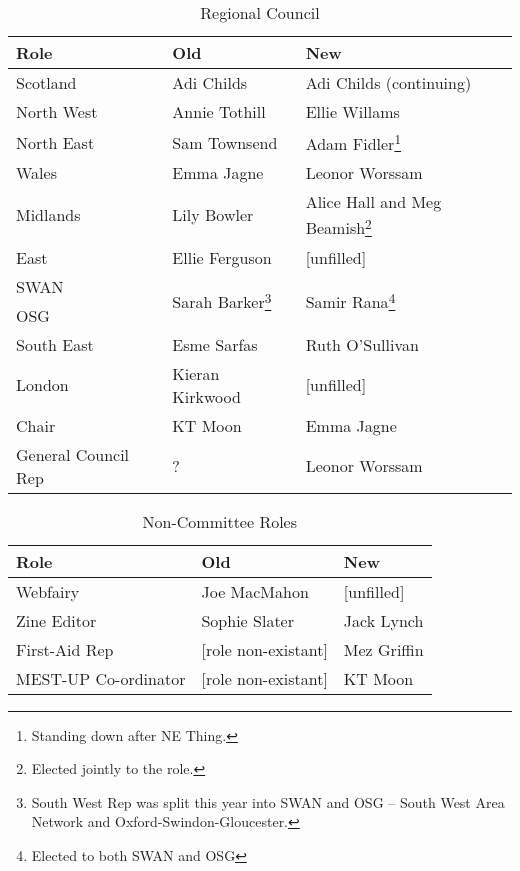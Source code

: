 \documentclass[a4paper, 12pt]{article}
\begin{document}
\begin{savenotes}
\begin{table}[H]
\centering

\begin{tabular}{ l || l | l }
\textbf{Role}		& \textbf{Old}		& \textbf{New} \\ \hline
Scotland			& Adi Childs		& Adi Childs (continuing) \\
North West			& Annie Tothill		& Ellie Willams \\
North East			& Sam Townsend		& Adam Fidler\footnote{Standing down after NE Thing.} \\
Wales				& Emma Jagne		& Leonor Worssam \\
Midlands			& Lily Bowler		& Alice Hall and Meg Beamish\footnote{Elected jointly to the role.} \\
East				& Ellie Ferguson	& [unfilled] \\
SWAN				& \multirow{2}{*}{Sarah Barker\footnote{South West Rep was split this year into SWAN and OSG -- South West Area Network and Oxford-Swindon-Gloucester.}} & \multirow{2}{*}{Samir Rana\footnote{Elected to both SWAN and OSG}} \\
OSG					& 					&  \\
South East			& Esme Sarfas		& Ruth O'Sullivan \\
London				& Kieran Kirkwood	& [unfilled] \\
Chair				& KT Moon			& Emma Jagne \\
General Council Rep	& ?					& Leonor Worssam \\
\end{tabular}
\caption{Regional Council}
\label{tab:council}
\end{table}
\end{savenotes}

\begin{savenotes}
\begin{table}[H]
\centering

\begin{tabular}{ l || l | l }
\textbf{Role}			& \textbf{Old}			& \textbf{New} \\ \hline
Webfairy				& Joe MacMahon			& [unfilled] \\
Zine Editor				& Sophie Slater			& Jack Lynch \\
First-Aid Rep			& [role non-existant]	& Mez Griffin \\
MEST-UP Co-ordinator	& [role non-existant]	& KT Moon \\
\end{tabular}
\caption{Non-Committee Roles}
\label{tab:nonctte}
\end{table}
\end{savenotes}
\end{document}
